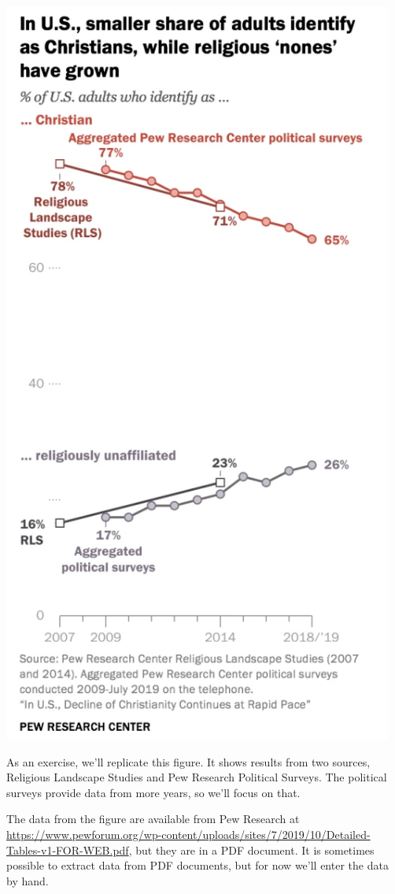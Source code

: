 \includegraphics{figs/pew_religion_figure1.png}

As an exercise, we'll replicate this figure. It shows results from two
sources, Religious Landscape Studies and Pew Research Political Surveys.
The political surveys provide data from more years, so we'll focus on
that.

The data from the figure are available from Pew Research at
\url{https://www.pewforum.org/wp-content/uploads/sites/7/2019/10/Detailed-Tables-v1-FOR-WEB.pdf},
but they are in a PDF document. It is sometimes possible to extract data
from PDF documents, but for now we'll enter the data by hand.

